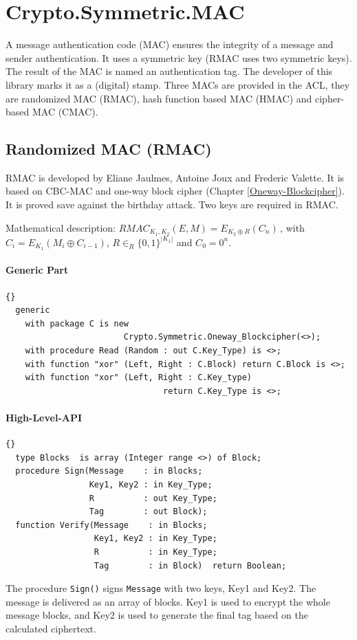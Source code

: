 \chapter{Crypto.Symmetric.MAC}\label{MAC}
A message authentication code (MAC) ensures the integrity of a message
and sender authentication. It uses a symmetric key (RMAC uses two
symmetric keys). The result of the MAC is named an authentication
tag. The developer of this library marks it as a (digital)
stamp. Three MACs are provided in the ACL, they are randomized MAC
(RMAC), hash function based MAC (HMAC) and cipher-based MAC (CMAC).


\section{Randomized MAC (RMAC)}
RMAC is developed by Eliane Jaulmes, Antoine Joux and Frederic
Valette. It is based on CBC-MAC and one-way block cipher (Chapter
\ref{Oneway-Blockcipher}). It is proved save against the birthday
attack. Two keys are required in RMAC.

 Mathematical description: $RMAC_{K_1,K_2}(E,M)=E_{K_2\oplus
   R}(C_n)$\,, with $C_i=E_{K_1}(M_i\oplus C_{i-1})$,
 $R\in_R\{0,1\}^{|K_1|}$ and $C_0=0^n$.

\subsubsection*{Generic Part}
\begin{lstlisting}{}
  generic
    with package C is new
    					Crypto.Symmetric.Oneway_Blockcipher(<>);
    with procedure Read (Random : out C.Key_Type) is <>;
    with function "xor" (Left, Right : C.Block) return C.Block is <>;
    with function "xor" (Left, Right : C.Key_type)
     							return C.Key_Type is <>;
\end{lstlisting}

\subsubsection*{High-Level-API}
\begin{lstlisting}{}
  type Blocks  is array (Integer range <>) of Block;
  procedure Sign(Message    : in Blocks;
                 Key1, Key2 : in Key_Type;
                 R          : out Key_Type;
                 Tag        : out Block);
  function Verify(Message    : in Blocks;
                  Key1, Key2 : in Key_Type;
                  R          : in Key_Type;
                  Tag        : in Block)  return Boolean;
\end{lstlisting}
The procedure \texttt{Sign()} signs \texttt{Message} with two keys,
Key1 and Key2. The message is delivered as an array of blocks. Key1 is
used to encrypt the whole message blocks, and Key2 is used to generate
the final tag based on the calculated ciphertext.

